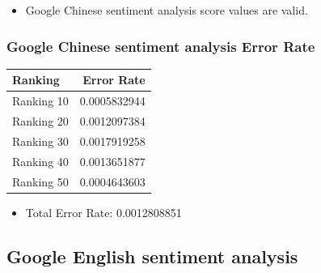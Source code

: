 \begin{itemize}
\item Google Chinese sentiment analysis score values are valid.
\end{itemize}

\subsubsection{Google Chinese sentiment analysis Error Rate}
\label{sec:orgc10477d}
\begin{center}
\begin{tabular}{lr}
Ranking & Error Rate\\
\hline
Ranking 10 & 0.0005832944\\
Ranking 20 & 0.0012097384\\
Ranking 30 & 0.0017919258\\
Ranking 40 & 0.0013651877\\
Ranking 50 & 0.0004643603\\
\end{tabular}
\end{center}

\begin{itemize}
\item Total Error Rate: 0.0012808851
\end{itemize}

\subsection{Google English sentiment analysis}
\label{sec:org1f9c9de}
